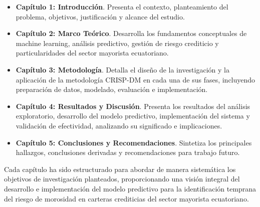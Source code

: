 \begin{itemize}
    \item \textbf{Capítulo 1: Introducción}. Presenta el contexto, planteamiento del problema, objetivos, justificación y alcance del estudio.
    
    \item \textbf{Capítulo 2: Marco Teórico}. Desarrolla los fundamentos conceptuales de machine learning, análisis predictivo, gestión de riesgo crediticio y particularidades del sector mayorista ecuatoriano.
    
    \item \textbf{Capítulo 3: Metodología}. Detalla el diseño de la investigación y la aplicación de la metodología CRISP-DM en cada una de sus fases, incluyendo preparación de datos, modelado, evaluación e implementación.
    
    \item \textbf{Capítulo 4: Resultados y Discusión}. Presenta los resultados del análisis exploratorio, desarrollo del modelo predictivo, implementación del sistema y validación de efectividad, analizando su significado e implicaciones.
    
    \item \textbf{Capítulo 5: Conclusiones y Recomendaciones}. Sintetiza los principales hallazgos, conclusiones derivadas y recomendaciones para trabajo futuro.
\end{itemize}

Cada capítulo ha sido estructurado para abordar de manera sistemática los objetivos de investigación planteados, proporcionando una visión integral del desarrollo e implementación del modelo predictivo para la identificación temprana del riesgo de morosidad en carteras crediticias del sector mayorista ecuatoriano.
